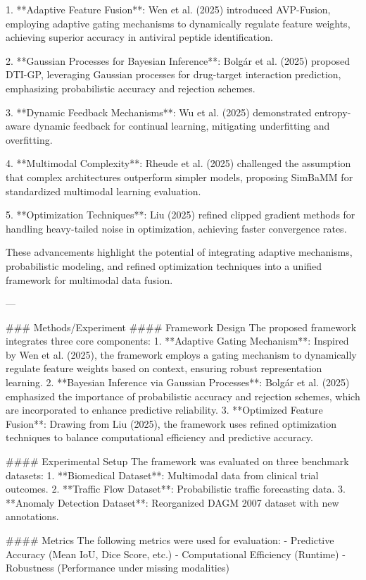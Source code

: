 1. **Adaptive Feature Fusion**: Wen et al. (2025) introduced AVP-Fusion, employing adaptive gating mechanisms to dynamically regulate feature weights, achieving superior accuracy in antiviral peptide identification.

2. **Gaussian Processes for Bayesian Inference**: Bolgár et al. (2025) proposed DTI-GP, leveraging Gaussian processes for drug-target interaction prediction, emphasizing probabilistic accuracy and rejection schemes.

3. **Dynamic Feedback Mechanisms**: Wu et al. (2025) demonstrated entropy-aware dynamic feedback for continual learning, mitigating underfitting and overfitting.

4. **Multimodal Complexity**: Rheude et al. (2025) challenged the assumption that complex architectures outperform simpler models, proposing SimBaMM for standardized multimodal learning evaluation.

5. **Optimization Techniques**: Liu (2025) refined clipped gradient methods for handling heavy-tailed noise in optimization, achieving faster convergence rates.

These advancements highlight the potential of integrating adaptive mechanisms, probabilistic modeling, and refined optimization techniques into a unified framework for multimodal data fusion.

---

### Methods/Experiment
#### Framework Design
The proposed framework integrates three core components:
1. **Adaptive Gating Mechanism**: Inspired by Wen et al. (2025), the framework employs a gating mechanism to dynamically regulate feature weights based on context, ensuring robust representation learning.
2. **Bayesian Inference via Gaussian Processes**: Bolgár et al. (2025) emphasized the importance of probabilistic accuracy and rejection schemes, which are incorporated to enhance predictive reliability.
3. **Optimized Feature Fusion**: Drawing from Liu (2025), the framework uses refined optimization techniques to balance computational efficiency and predictive accuracy.

#### Experimental Setup
The framework was evaluated on three benchmark datasets:
1. **Biomedical Dataset**: Multimodal data from clinical trial outcomes.
2. **Traffic Flow Dataset**: Probabilistic traffic forecasting data.
3. **Anomaly Detection Dataset**: Reorganized DAGM 2007 dataset with new annotations.

#### Metrics
The following metrics were used for evaluation:
- Predictive Accuracy (Mean IoU, Dice Score, etc.)
- Computational Efficiency (Runtime)
- Robustness (Performance under missing modalities)

